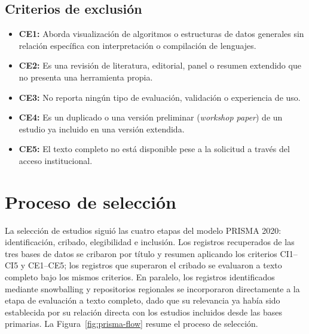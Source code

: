 \subsection{Criterios de exclusión}

\begin{itemize}
    \item \textbf{CE1:} Aborda visualización de algoritmos o estructuras de datos generales sin relación específica con interpretación o compilación de lenguajes.
    \item \textbf{CE2:} Es una revisión de literatura, editorial, panel o resumen extendido que no presenta una herramienta propia.
    \item \textbf{CE3:} No reporta ningún tipo de evaluación, validación o experiencia de uso.
    \item \textbf{CE4:} Es un duplicado o una versión preliminar (\emph{workshop paper}) de un estudio ya incluido en una versión extendida.
    \item \textbf{CE5:} El texto completo no está disponible pese a la solicitud a través del acceso institucional.
\end{itemize}

\section{Proceso de selección}

La selección de estudios siguió las cuatro etapas del modelo PRISMA 2020: identificación, cribado, elegibilidad e inclusión. Los registros recuperados de las tres bases de datos se cribaron por título y resumen aplicando los criterios CI1--CI5 y CE1--CE5; los registros que superaron el cribado se evaluaron a texto completo bajo los mismos criterios. En paralelo, los registros identificados mediante snowballing y repositorios regionales se incorporaron directamente a la etapa de evaluación a texto completo, dado que su relevancia ya había sido establecida por su relación directa con los estudios incluidos desde las bases primarias. La Figura~\ref{fig:prisma-flow} resume el proceso de selección.

